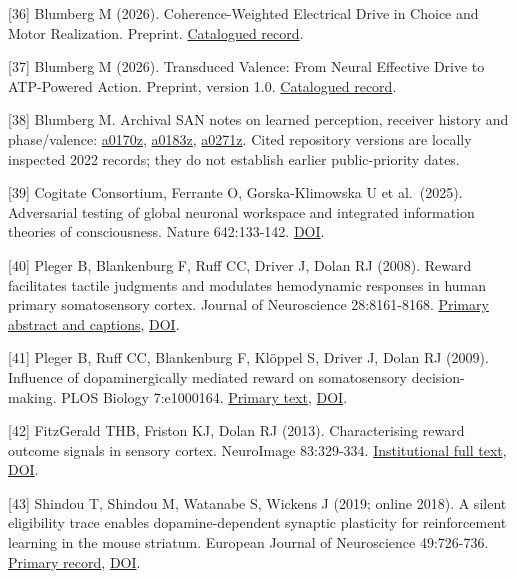 \documentclass[
  american,
  11pt,
  letterpaper,
]{article}
\begin{document}
{[}36{]} Blumberg M (2026). Coherence-Weighted Electrical Drive in Choice and Motor Realization. Preprint. \href{https://zenodo.org/records/21693966}{Catalogued record}.

{[}37{]} Blumberg M (2026). Transduced Valence: From Neural Effective Drive to ATP-Powered Action. Preprint, version 1.0. \href{https://zenodo.org/records/21857678}{Catalogued record}.

{[}38{]} Blumberg M. Archival SAN notes on learned perception, receiver history and phase/valence: \href{https://github.com/v5ma/selfawarenetworks/blob/0546fa6b18cc5117d145157e1a2ff1c82e0a2de2/a0170z.md}{a0170z}, \href{https://github.com/v5ma/selfawarenetworks/blob/c48b3290909dbb5aeb8dfb8e860c1ca395ead49b/a0183z.md}{a0183z}, \href{https://github.com/v5ma/selfawarenetworks/blob/75b194fb97d2da09fb8bdd4130be98b910a72adb/a0271z.md}{a0271z}. Cited repository versions are locally inspected 2022 records; they do not establish earlier public-priority dates.

{[}39{]} Cogitate Consortium, Ferrante O, Gorska-Klimowska U et al.~(2025). Adversarial testing of global neuronal workspace and integrated information theories of consciousness. Nature 642:133-142. \href{https://doi.org/10.1038/s41586-025-08888-1}{DOI}.

{[}40{]} Pleger B, Blankenburg F, Ruff CC, Driver J, Dolan RJ (2008). Reward facilitates tactile judgments and modulates hemodynamic responses in human primary somatosensory cortex. Journal of Neuroscience 28:8161-8168. \href{https://pubmed.ncbi.nlm.nih.gov/18701678/}{Primary abstract and captions}, \href{https://doi.org/10.1523/JNEUROSCI.1093-08.2008}{DOI}.

{[}41{]} Pleger B, Ruff CC, Blankenburg F, Klöppel S, Driver J, Dolan RJ (2009). Influence of dopaminergically mediated reward on somatosensory decision-making. PLOS Biology 7:e1000164. \href{https://journals.plos.org/plosbiology/article?id=10.1371/journal.pbio.1000164}{Primary text}, \href{https://doi.org/10.1371/journal.pbio.1000164}{DOI}.

{[}42{]} FitzGerald THB, Friston KJ, Dolan RJ (2013). Characterising reward outcome signals in sensory cortex. NeuroImage 83:329-334. \href{https://discovery.ucl.ac.uk/id/eprint/1399507/1/FitzGerald_NeuroImage.pdf}{Institutional full text}, \href{https://doi.org/10.1016/j.neuroimage.2013.06.061}{DOI}.

{[}43{]} Shindou T, Shindou M, Watanabe S, Wickens J (2019; online 2018). A silent eligibility trace enables dopamine-dependent synaptic plasticity for reinforcement learning in the mouse striatum. European Journal of Neuroscience 49:726-736. \href{https://pubmed.ncbi.nlm.nih.gov/29603470/}{Primary record}, \href{https://doi.org/10.1111/ejn.13921}{DOI}.
\end{document}
